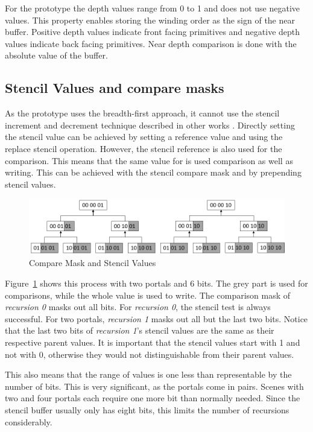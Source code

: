 For the prototype the depth values range from 0 to 1 and does not use negative values. This property enables storing the winding order as the sign of the near buffer. Positive depth values indicate front facing primitives and negative depth values indicate back facing primitives. Near depth comparison is done with the absolute value of the buffer.

\subsection{Stencil Values and compare masks}
\label{section:stencilcomparemasks}

As the prototype uses the breadth-first approach, it cannot use the stencil increment and decrement technique described in other works \cite{schmalstieg:1999:sewing, lowe:2003:fragment, lecture:portalProblems}. Directly setting the stencil value can be achieved by setting a reference value and using the replace stencil operation. However, the stencil reference is also used for the comparison. This means that the same value for is used comparison as well as writing. This can be achieved with the stencil compare mask and by prepending stencil values.

\begin{figure}[h]
	\includegraphics[width=\linewidth]{images/stencilvalues2.png}
	\caption{Compare Mask and Stencil Values}
	\label{fig:stencilvalues}
\end{figure}

Figure~\ref{fig:stencilvalues} shows this process with two portals and 6 bits. The grey part is used for comparisons, while the whole value is used to write. The comparison mask of \textit{recursion 0} masks out all bits. For \textit{recursion 0}, the stencil test is always successful. For two portals, \textit{recursion 1} masks out all but the last two bits. Notice that the last two bits of \textit{recursion 1}'s stencil values are the same as their respective parent values. It is important that the stencil values start with 1 and not with 0, otherwise they would not distinguishable from their parent values.

This also means that the range of values is one less than representable by the number of bits. This is very significant, as the portals come in pairs. Scenes with two and four portals each require one more bit than normally needed. Since the stencil buffer usually only has eight bits, this limits the number of recursions considerably.



